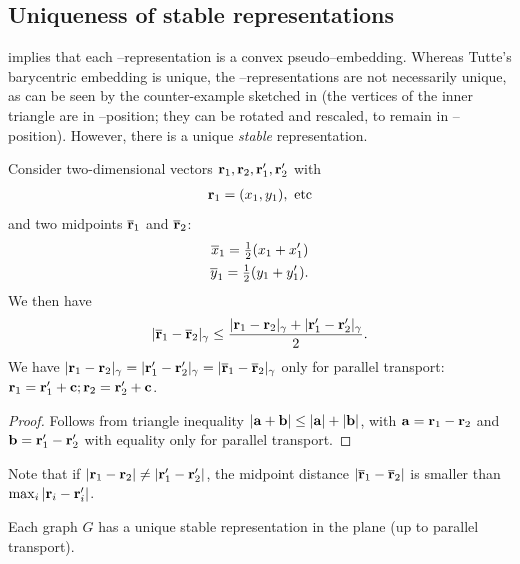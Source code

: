 \documentclass[invmat]{svjour}
\begin{document}
\subsection{Uniqueness of stable representations}
\label{s:uniqueness}

 implies that each \M--representation is
a convex pseudo--embedding.  Whereas Tutte's barycentric embedding is
unique, the \M--representations are not necessarily unique, as can be
seen by the counter-example sketched in 
(the vertices of the inner triangle are in \M--position; they can be
rotated  and rescaled, to remain in \M--position).  However, there is
a unique  \emph{stable} representation.

\begin{lemma}
\label{l:midpoint_plane}
Consider two-dimensional vectors $\mathbf{r}_1, \mathbf{r}_2,\mathbf{r}'_1, \mathbf{r}'_2$
with
\begin{align*}
\mathbf{r}_1=(x_1,y_1),\ \text{etc}
\end{align*}
and two midpoints $\overline{\mathbf{r}}_1$ and $\overline{\mathbf{r}}_2$:
\begin{align*}
\overline{x}_1= \tfrac{1}{2} (x_1+x'_1)\\
\overline{y}_1= \tfrac{1}{2} (y_1+y'_1).
\end{align*}
We then have
\begin{equation*}
|\overline{\mathbf{r}}_1-\overline{\mathbf{r}}_2|_{\gamma} \le
\frac{|\mathbf{r}_1-\mathbf{r}_2|_{\gamma} + |\mathbf{r}'_1-\mathbf{r}'_2|_{\gamma} }{2}.
\notag
\end{equation*}
We have $|\mathbf{r}_1-\mathbf{r}_2|_{\gamma}=
|\mathbf{r}'_1-\mathbf{r}'_2|_{\gamma}=|\overline{\mathbf{r}}_1-\overline{\mathbf{r}}_2|_{\gamma}$
only for parallel transport: $\mathbf{r}_1=\mathbf{r}'_1 + \mathbf{c};  \mathbf{r}_2= \mathbf{r}'_2 + \mathbf{c}$.
\end{lemma}

\begin{proof}
Follows  from  triangle inequality $| \mathbf{a} + \mathbf{b} | \le |
\mathbf{a} | + | \mathbf{b} |$, with $\mathbf{a}=\mathbf{r}_1 - \mathbf{r}_2$ and $\mathbf{b}=
\mathbf{r}'_1-\mathbf{r}'_2$ with equality only for parallel transport.
\end{proof}
Note that if $|\mathbf{r}_1-\mathbf{r}_2| \neq |\mathbf{r}'_1-\mathbf{r}'_2|$, the midpoint
distance $|\overline{\mathbf{r}}_1-\overline{\mathbf{r}}_2|$ is smaller than $\max_i
|\mathbf{r}_i-\mathbf{r}_i'|$.

\begin{proposition}
\label{p:unique_plane}
Each graph $G$ has
a unique stable representation in the plane (up to parallel transport).
\end{proposition}
\end{document}
